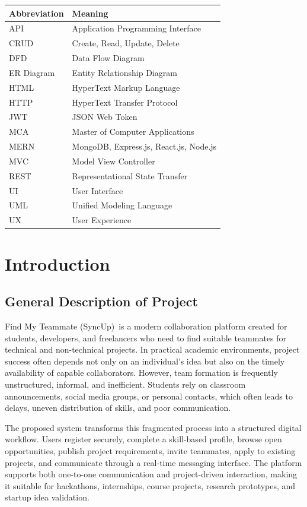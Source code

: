 \documentclass[12pt,a4paper,oneside]{report}
\newcommand{\projecttitle}{Find My Teammate (SyncUp)}
\begin{document}
{\small
\setlength{\tabcolsep}{4pt}
\begin{longtable}{L{1.2in}L{4.05in}}
\toprule
\textbf{Abbreviation} & \textbf{Meaning} \\
\midrule
API & Application Programming Interface \\
CRUD & Create, Read, Update, Delete \\
DFD & Data Flow Diagram \\
ER Diagram & Entity Relationship Diagram \\
HTML & HyperText Markup Language \\
HTTP & HyperText Transfer Protocol \\
JWT & JSON Web Token \\
MCA & Master of Computer Applications \\
MERN & MongoDB, Express.js, React.js, Node.js \\
MVC & Model View Controller \\
REST & Representational State Transfer \\
UI & User Interface \\
UML & Unified Modeling Language \\
UX & User Experience \\
\bottomrule
\end{longtable}
}

\clearpage
{}
\setcounter{page}{1}
\pagestyle{plain}

\chapter{Introduction}

\section{General Description of Project}
\projecttitle\ is a modern collaboration platform created for students, developers, and freelancers who need to find suitable teammates for technical and non-technical projects. In practical academic environments, project success often depends not only on an individual's idea but also on the timely availability of capable collaborators. However, team formation is frequently unstructured, informal, and inefficient. Students rely on classroom announcements, social media groups, or personal contacts, which often leads to delays, uneven distribution of skills, and poor communication.

The proposed system transforms this fragmented process into a structured digital workflow. Users register securely, complete a skill-based profile, browse open opportunities, publish project requirements, invite teammates, apply to existing projects, and communicate through a real-time messaging interface. The platform supports both one-to-one communication and project-driven interaction, making it suitable for hackathons, internships, course projects, research prototypes, and startup idea validation.
\end{document}
